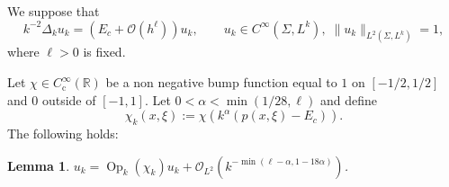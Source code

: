 \documentclass[JEP,XML,SOM,Unicode,published]{cedram}
\theoremstyle{plain}
\newtheorem{lemma}[theorem]{Lemma}
\theoremstyle{definition}
\let\mc\mathcal
\newcommand{\R}{\mathbb{R}}
\DeclareMathOperator{\comp}{c}
\DeclareMathOperator{\Op}{Op}
\begin{document}
We suppose that
\begin{equation}
\label{equation:to-use}
k^{-2}\Delta_k u_k = (E_c+\mc{O}(h^\ell))u_k, \qquad u_k \in C^\infty(\Sigma,L^{k}),\; \|u_k\|_{L^2(\Sigma,L^{k})} = 1,
\end{equation}
where $\ell > 0$ is fixed.

Let $\chi \in C^\infty_{\comp}(\R)$ be a non negative bump function equal to $1$ on $[-1/2,1/2]$ and $0$ outside of $[-1,1]$. Let $0 < \alpha < \min(1/28,\ell)$ and define
\[
\chi_k(x,\xi) := \chi(k^\alpha (p(x,\xi)-E_c)).
\]
The following holds:

\begin{lemma} \label{lemma:1} $u_k = \Op_k(\chi_k)u_k + \mc{O}_{L^2}(k^{-\min(\ell-\alpha,1-18\alpha)})$. \end{lemma}
\end{document}
